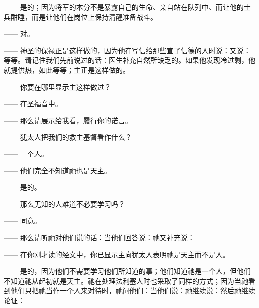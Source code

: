 —— 是的；因为将军的本分不是暴露自己的生命、亲自站在队列中、而让他的士兵酣睡，而是让他们在岗位上保持清醒准备战斗。\par

—— 对。\par

—— 神圣的保禄正是这样做的，因为他在写信给那些宣了信德的人时说：又说：等等。请记住我们先前说过的话：医生补充自然所缺乏的。如果他发现冷过剩，他就提供热，如此等等；主正是这样做的。\par

—— 你要在哪里显示主这样做过？\par

—— 在圣福音中。\par

—— 那么请展示给我看，履行你的诺言。\par

—— 犹太人把我们的救主基督看作什么？\par

—— 一个人。\par

—— 他们完全不知道祂也是天主。\par

—— 是的。\par

—— 那么无知的人难道不必要学习吗？\par

—— 同意。\par

—— 那么请听祂对他们说的话：当他们回答说：祂又补充说：\par

—— 在你刚才读的经文中，你已显示主向犹太人表明祂是天主而不是人。\par

—— 是的，因为他们不需要学习他们所知道的事；他们知道祂是一个人，但他们不知道祂从起初就是天主。祂在处理法利塞人时也采取了同样的方式；因为当祂看到他们只把祂当作一个人来对待时，祂问他们：当他们说：祂继续说：然后祂继续论证：\par

